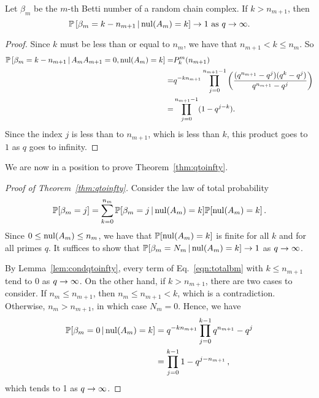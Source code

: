 \begin{lemma}
  \label{lem:condqtoinfty2}
Let $\beta_m$ be the $m$-th Betti number of a random chain complex.  If $k > n_{m+1}$, then
\[
\mathbb{P}\left[\beta_m= k - n_{m+1} \,|\, \mathrm{nul}(A_{m}) = k \right] \to 1 \textrm{ as } q\to\infty.
\]
\end{lemma}

\begin{proof}
Since $k$ must be less than or equal to $n_m$, we have that $n_{m+1} < k \leq n_m$.  So
	\begin{align*}
	\mathbb{P}\left[\beta_m = k - n_{m+1} \,|\, A_{m}A_{m+1} = 0, \mathrm{nul}(A_{m}) = k \right]
    =& P^m_k(n_{m+1})\\
    =& q^{-kn_{m+1}}\prod_{j=0}^{n_{m+1}-1} \left(\frac{(q^{n_{m+1}} - q^j)(q^k - q^j)}{q^{n_{m+1}} - q^j}  \right)  \\
    =&  \prod_{j=0}^{n_{m+1}-1}(1-q^{j-k}).
	\end{align*}
Since the index $j$ is less than to $n_{m+1}$, which is less than $k$, this product goes to $1$ as $q$ goes to infinity.
\end{proof}


We are now in a position to prove Theorem~\ref{thm:qtoinfty}.

\begin{proof}[Proof of Theorem~\ref{thm:qtoinfty}]
  Consider the law of total probability
  \begin{equation}
    \label{eqn:totalbm}
    \mathbb{P}[\beta_m = j] = \sum_{k=0}^{n_m} \mathbb{P}[\beta_m = j \,|\, \mathrm{nul}(A_m) = k]
    \mathbb{P}[\mathrm{nul}(A_m) = k] \, .
  \end{equation}
   Since $0 \leq \mathrm{nul}(A_m) \leq n_m$, we have that $\mathbb{P}[\mathrm{nul}(A_m) = k]$ is
   finite for all $k$ and for all primes $q$.  It suffices to show that 
   $\mathbb{P}[\beta_m =N_m \,|\, \mathrm{nul}(A_m) = k] \rightarrow 1$ as $q \rightarrow \infty$.
   
   By Lemma~\ref{lem:condqtoinfty}, every
   term of Eq.~\eqref{eqn:totalbm} with $k\leq n_{m+1}$ tend to 0 as $q \rightarrow \infty$.
   On the other hand, if $k>n_{m+1}$, there are two cases to consider.
   If $n_m \leq n_{m+1}$, then $n_m \leq n_{m+1} < k$, which is a contradiction.
   Otherwise, $n_m > n_{m+1}$, in which case $N_m = 0$. Hence, we have
   \begin{align*}
     \mathbb{P}[\beta_m = 0 \,|\, \mathrm{nul}(A_m) = k] &= q^{-k n_{m+1}} \prod_{j=0}^{k-1}q^{n_{m+1}}-q^j \\
     &= \prod_{j=0}^{k-1} 1 - q^{j-n_{m+1}} \, ,
   \end{align*}
   which tends to 1 as $q \rightarrow \infty$.
 \end{proof}




